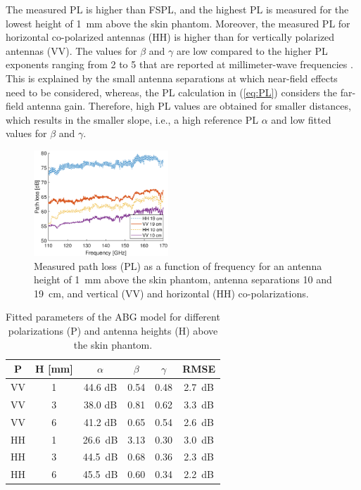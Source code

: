 \documentclass[preprint]{rsl}
\begin{document}
The measured PL is higher than FSPL, and the highest PL is measured for the lowest height of 1~mm above the skin phantom.
Moreover, the measured PL for horizontal co-polarized antennas (HH) is higher than for vertically polarized antennas (VV).
The values for $\beta$ and $\gamma$ are low compared to the higher PL exponents ranging from 2 to 5 that are reported at millimeter-wave frequencies \cite{Petrillo2014, Aminzadeh2021_tap}. 
This is explained by the small antenna separations at which near-field effects need to be considered, whereas, the PL calculation in (\ref{eq:PL}) considers the far-field antenna gain.
Therefore, high PL values are obtained for smaller distances, which results in the smaller slope, i.e., a high reference PL $\alpha$ and low fitted values for $\beta$ and $\gamma$.

\begin{figure}[t]
\begin{center}
  \includegraphics[width=0.45\textwidth]{figures/PL_vs_freq}
\caption{Measured path loss (PL) as a function of frequency for an antenna height of 1~mm above the skin phantom, antenna separations 10 and 19~cm, and vertical (VV) and horizontal (HH) co-polarizations.}
\label{fig:PL_vs_freq}
\end{center}
\end{figure}
\begin{table}[t]
  \caption{Fitted parameters of the ABG model for different polarizations (P) and antenna heights (H) above the skin phantom.}
  \label{table:ABG}
  \begin{center}
    \begin{tabular}{cc|cccc}
      P & H [mm] & $\alpha$ & $\beta$ & $\gamma$ & RMSE \\
      \hline
      VV & 1 & 44.6 dB & 0.54 & 0.48 & 2.7~dB \\
      VV & 3 & 38.0 dB & 0.81 & 0.62 & 3.3~dB \\
      VV & 6 & 41.2 dB & 0.65 & 0.54 & 2.6~dB \\
      HH & 1 & 26.6~dB & 3.13 & 0.30 & 3.0~dB \\
      HH & 3 & 44.5~dB & 0.68 & 0.36 & 2.3~dB \\
      HH & 6 & 45.5~dB & 0.60 & 0.34 & 2.2~dB \\
    \end{tabular}
  \end{center}
\end{table}
\end{document}
